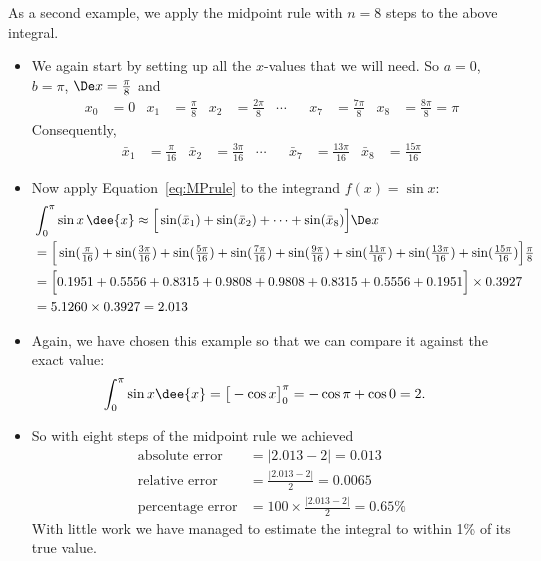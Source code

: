 \begin{eg}\label{eg:Midpoint}
As a second example, we apply the midpoint rule with $n=8$ steps
to the above integral.

\begin{itemize}
 \item We again start by setting up all the $x$-values that we will need. So $a=0$,
$b=\pi$, $\De x=\tfrac{\pi}{8}$ and
\begin{align*}
x_0&=0& x_1&=\tfrac{\pi}{8}&
x_2&=\tfrac{2\pi}{8}& \cdots&&
x_7&=\tfrac{7\pi}{8}&
x_8&=\tfrac{8\pi}{8}=\pi
\end{align*}
Consequently,
\begin{align*}
\bar x_1&=\tfrac{\pi}{16}&
\bar x_2&=\tfrac{3\pi}{16} & \cdots&&
\bar x_7&=\tfrac{13\pi}{16} &
\bar x_8&=\tfrac{15\pi}{16}
\end{align*}

\item Now apply Equation~\eqref{eq:MPrule} to the integrand $f(x)=\sin x$:
\begin{align*}
&\int_0^\pi\sin x\,\dee{x}
\approx\Big[\sin(\bar x_1)+\sin(\bar x_2)+\cdots+\sin(\bar x_8)\Big]\De x\\
&=\Big[\sin(\tfrac{\pi}{16})+
             \sin(\tfrac{3\pi}{16})+
             \sin(\tfrac{5\pi}{16})+
             \sin(\tfrac{7\pi}{16})+
             \sin(\tfrac{9\pi}{16})+
             \sin(\tfrac{11\pi}{16})+
             \sin(\tfrac{13\pi}{16})+
             \sin(\tfrac{15\pi}{16})\Big]\tfrac{\pi}{8}\\
&=\Big[0.1951+
             0.5556+
             0.8315+
             0.9808+
             0.9808+
             0.8315+
             0.5556+
             0.1951\Big]\times 0.3927\\
&=5.1260\times 0.3927
=2.013
\end{align*}

\item Again, we have chosen this example so that we can compare it against the exact
value:
\begin{align*}
  \int_0^\pi \sin x \dee{x} &= \big[ -\cos x \big]_0^\pi = -\cos\pi + \cos 0 = 2.
\end{align*}
\item So with eight steps of the midpoint rule we achieved
\begin{align*}
  \text{absolute error} &= |2.013-2|=0.013\\
  \text{relative error} &= \frac{|2.013-2|}{2} = 0.0065 \\
  \text{percentage error} &= 100 \times \frac{|2.013-2|}{2} = 0.65 \%
\end{align*}
With little work we have managed to estimate the integral to within 1\% of its true
value.
\end{itemize}
\end{eg}



